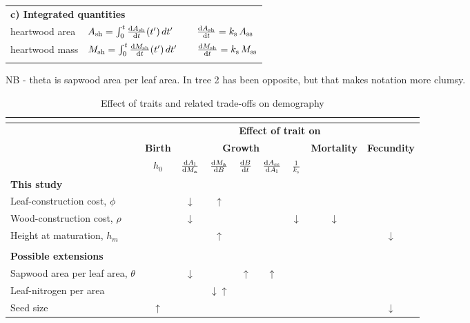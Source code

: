 \documentclass[12pt, a4paper]{article}
\begin{document}
\begin{table}[ht]
{\begin{doublespace}
\begin{tabular}{p{2.5cm}p{3.5cm}p{5cm}p{4cm} }
  \multicolumn{4}{l}{\textbf{c) Integrated quantities}} \\
  heartwood area &
    $A_{\rm sh} = \int_0^t \frac{{\rm d}A_{\rm sh}}{{\rm d}t}(t^\prime) \, dt^\prime$ &
     &
    $\frac{{\rm d}A_{\rm sh}}{{\rm d}t} = k_\textrm{s} \, A_\textrm{ss}$ \\
  heartwood mass &
    $M_{\rm sh} = \int_0^t \frac{{\rm d}M_{\rm sh}}{{\rm d}t}(t^\prime) \, dt^\prime$ &
     &
    $\frac{{\rm d}M_{\rm sh}}{{\rm d}t} = k_\textrm{s} \, M_\textrm{ss}$ \\
  \hline \\
\end{tabular}
NB -  theta is sapwood area per leaf area. In tree 2 has been opposite, but that makes notation more clumsy.
\end{doublespace}}
\label{tab:allometry}
\end{table}

\newpage

\begin{table}[ht]
\caption{Effect of traits and related trade-offs on demography}
\centering
{\footnotesize  %
  \begin{doublespace}
  \begin{tabular}[c]{l|c|ccccc|c|c}
  \multicolumn{9}{c}{}\\ \hline
  & \multicolumn{8}{c}{\textbf{Effect of trait on}}\\
  & \textbf{Birth} & \multicolumn{5}{c|}{\textbf{Growth}} & \textbf{Mortality} & \textbf{Fecundity} \\
  & $h_0$
  & $\frac{{\rm d}A_{\rm l}}{{\rm d}M_{\rm a}}$
  & $\frac{{\rm d}M_{\rm a}}{{\rm d}B}$
  & $\frac{{\rm d}B}{{\rm d}t}$
  & $\frac{{\rm d}A_\textrm{ss}}{{\rm d}A_{\rm l}}$
  & $\frac{1}{k_s}$ & &  \\\hline
  \textbf{This study}&&&&&&&&\\
  Leaf-construction cost, $\phi$ & & $\downarrow$ & $\uparrow$ & & & & \\
  Wood-construction cost, $\rho$ & & $\downarrow$ &  & & & $\downarrow$ & $\downarrow$  \\
  Height at maturation, $h_m$ & & &$\uparrow$ & & & & & $\downarrow$  \\
  &&&&&&&&\\\hline
  \textbf{Possible extensions}&&&&&&&&\\
  Sapwood area per leaf area, $\theta$ & & $\downarrow$& & $\uparrow$ & $\uparrow$ & & \\
  Leaf-nitrogen per area & & &$\downarrow$$\uparrow$ & & & & & \\
  Seed size & $\uparrow$ & & & & & & & $\downarrow$ \\ \hline
  \end{tabular}
  \end{doublespace}
}
\label{tab:trade-offs}
\end{table}
\end{document}
